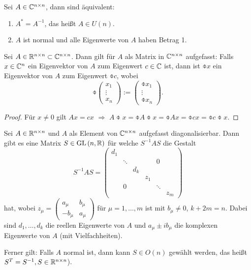 \begin{folg}
 Sei $A \in \mathbb{C}^{n \times n}$, dann sind äquivalent:
 \begin{enumerate}[(1)]
  \item $A^* = A^{-1}$, das heißt $A \in U(n)$.
  \item $A$ ist normal und alle Eigenwerte von $A$ haben Betrag 1.
 \end{enumerate}
\end{folg}

\begin{lem}
 Sei $A \in \mathbb{R}^{n \times n} \subset \mathbb{C}^{n \times n}$. Dann gilt für $A$ als Matrix in $\mathbb{C}^{n \times n}$ aufgefasst: Falls $x \in \mathbb{C}^n$ ein Eigenvektor von $A$ zum Eigenwert $c \in \mathbb{C}$ ist, dann ist $\obar{x}$ ein Eigenvektor von $A$ zum Eigenwert $\obar{c}$, wobei
 \[ \obar{\begin{pmatrix} x_1 \\ \vdots \\ x_n \end{pmatrix}} := \begin{pmatrix} \obar{x}_1 \\ \vdots \\ \obar{x}_n \end{pmatrix}. \]
\end{lem}

\begin{proof}
 Für $x \ne 0$ gilt $Ax = cx $ $\Rightarrow$  $A\obar{x} = \obar{A}\obar{x} = \obar{Ax} = \obar{cx} = \obar{c} \obar{x}$.
\end{proof}

\begin{thm}
 Sei $A \in \mathbb{R}^{n \times n}$ und $A$ als Element von $\mathbb{C}^{n \times n}$ aufgefasst diagonalisierbar\footnotemark. Dann gibt es eine Matrix $S \in \mathrm{GL}\,(n, \mathbb{R})$ für welche $S^{-1} A S$ die Gestalt
 \[ S^{-1} A S = \begin{pmatrix}
     d_1 &        &     &     &        &      \\
         & \ddots &     &     & 0      &      \\
         &        & d_k &     &        &      \\
         &        &     & \boxed{z_1} &        &      \\
         & 0      &     &     & \ddots &      \\
         &        &     &     &        & \boxed{z_m}
    \end{pmatrix} \]
 hat, wobei $z_\mu = \begin{pmatrix} a_\mu & b_\mu \\ -b_\mu & a_\mu \end{pmatrix}$ für $\mu = 1, \ldots, m$ ist mit $b_\mu \ne 0$, $k+2m = n$. Dabei sind $d_1, \ldots, d_k$ die reellen Eigenwerte von $A$ und $a_\mu \pm i b_\mu$ die komplexen Eigenwerte von $A$ (mit Vielfachheiten).
 
 Ferner gilt: Falls $A$ normal ist, dann kann $S \in O(n)$ gewählt werden, das heißt $S^T = S^{-1}, S \in \mathbb{R}^{n \times n}$).
\end{thm}


